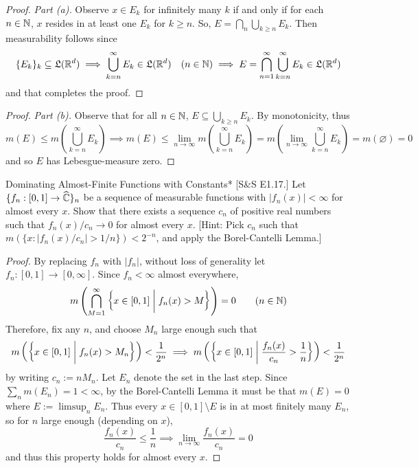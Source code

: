 \begin{proof}
    \emph{Part (a).} Observe \(x \in E_k\) for infinitely many \(k\) if and only if for each \(n \in \mathbb{N}\), \(x\) resides in at least one \(E_k\) for \(k \geq n\). So, \(E = \bigcap_n \bigcup_{k \geq n} E_k\). Then measurability follows since 
    \[
    \{E_k\}_k \subseteq \mathfrak{L}(\mathbb{R}^d)
    \implies \bigcup_{k = n}^\infty E_k \in \mathfrak{L}(\mathbb{R}^d) \quad (n \in \mathbb{N})
    \implies E = \bigcap_{n=1}^\infty \bigcup_{k = n}^\infty E_k \in \mathfrak{L}(\mathbb{R}^d)
    \]
    and that completes the proof.
\end{proof}

\begin{proof}
    \emph{Part (b).} Observe that for all \(n \in \mathbb{N}\), \(E \subseteq \bigcup_{k \geq n} E_k\). By monotonicity, thus 
    \[
        m(E) 
        \leq m \left( \bigcup_{k = n}^\infty E_k \right)
        \implies 
        m(E) 
        \leq \lim_{n \to \infty} m\left(\bigcup_{k = n}^\infty E_k \right) 
        = m\left(\lim_{n \to \infty} \bigcup_{k = n}^\infty E_k \right) 
        = m(\varnothing) 
        = 0
    \]
    and so \(E\) has Lebesgue-measure zero. 
\end{proof}

\begin{problem}{Dominating Almost-Finite Functions with Constants}*
    [S\&S E1.17.] Let \(\{f_n : [0, 1] \to \widehat{\mathbb{C}}\}_n\) be a sequence of measurable functions with \(|f_n(x)|<\infty\) for almost every \(x\). Show that there exists a sequence \(c_n\) of positive real numbers such that \(f_n(x) / c_n \to 0\) for almost every \(x\). [Hint: Pick \(c_n\) such that \(m(\{x : |f_n(x) / c_n| > 1/n\}) < 2^{-n}\), and apply the Borel-Cantelli Lemma.]
\end{problem}

\begin{proof}
    By replacing \(f_n\) with \(|f_n|\), without loss of generality let \(f_n : [0,1] \to [0, \infty]\). Since \(f_n < \infty\) almost everywhere, 
    \[
    m\left( \bigcap_{M = 1}^\infty \left\{ x \in [0, 1] \;\biggr\rvert\; f_n(x) > M \right\} \right) = 0
    \qquad (n \in \mathbb{N})
    \]
    Therefore, fix any \(n\), and choose \(M_n\) large enough such that 
    \[
    m\left( \left\{ x \in [0, 1] \;\biggr\rvert\; f_n(x) > M_n \right\} \right) < \frac{1}{2^n}
    \implies 
    m\left( \left\{ x \in [0, 1] \;\biggr\rvert\; \frac{f_n(x)}{c_n} > \frac{1}{n} \right\} \right) < \frac{1}{2^n}
    \]
    by writing \(c_n := nM_n\). Let \(E_n\) denote the set in the last step. Since \(\sum_{n} m(E_n) = 1 < \infty\), by the Borel-Cantelli Lemma it must be that \(m(E) = 0\) where \(E := \limsup_n E_n\). Thus every \(x \in [0, 1] \setminus E\) is in at most finitely many \(E_n\), so for \(n\) large enough (depending on \(x\)), 
    \[
    \frac{f_n(x)}{c_n} \leq \frac{1}{n} \implies \lim_{n \to \infty} \frac{f_n(x)}{c_n} = 0
    \]
    and thus this property holds for almost every \(x\). 
\end{proof}

